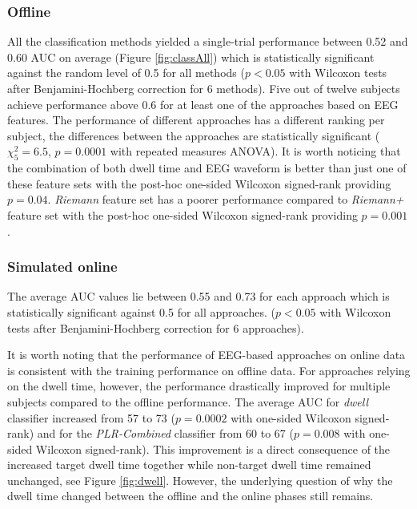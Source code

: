 \documentclass[12pt]{iopart}
\begin{document}
\subsubsection*{Offline}
All the classification methods yielded a single-trial 
performance between 0.52 and 0.60 AUC on average
(Figure \ref{fig:classAll})
which is statistically significant against the random level of 0.5 
for all methods
($p < 0.05$ with Wilcoxon tests after Benjamini-Hochberg correction
for 6 methods).
Five out of twelve subjects achieve performance 
above 0.6 for at least one of the approaches based
on EEG features.
The performance of different approaches has a different ranking per subject,
the differences between
the approaches are statistically significant ($\chi^2_5 = 6.5$, $p = 0.0001$ with repeated measures ANOVA).
It is worth noticing that the combination of both dwell time and EEG waveform is
better than just one of these feature sets with the post-hoc 
one-sided Wilcoxon signed-rank providing $p = 0.04$.
\textit{Riemann} feature set has a poorer performance compared to \textit{Riemann+}
feature set with the post-hoc
one-sided Wilcoxon signed-rank providing $p = 0.001$.

\subsubsection*{Simulated online}
The average AUC values lie between 0.55 and 0.73 for each approach
which is statistically significant against 0.5
for all approaches.
($p < 0.05$ with Wilcoxon tests after Benjamini-Hochberg correction 
for 6 approaches).

It is worth noting that the performance of EEG-based approaches
on online data is consistent with the training performance on offline data.
For approaches relying on the dwell time, however, the performance drastically improved
for multiple subjects compared to the offline performance.
The average AUC for \textit{dwell} classifier increased
from 57 to 73 ($p = 0.0002$ with one-sided Wilcoxon signed-rank) and for 
the \textit{PLR-Combined} classifier from 60 to 67 ($p = 0.008$ with one-sided Wilcoxon signed-rank).
This improvement is a direct consequence of the increased target dwell time
together while non-target dwell time remained unchanged, see Figure \ref{fig:dwell}.
However, the underlying question of why the dwell time changed 
between the offline and the online phases still remains.
\end{document}
